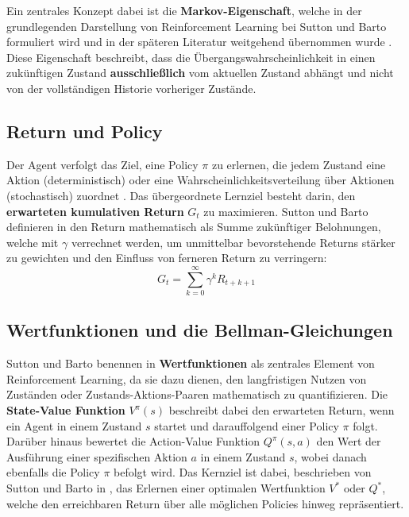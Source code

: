 Ein zentrales Konzept dabei ist die \textbf{Markov-Eigenschaft}, welche in der grundlegenden Darstellung von Reinforcement Learning bei Sutton und Barto formuliert wird und in der späteren Literatur weitgehend übernommen wurde \cite{sutton2018reinforcement, francois-lavetIntroductionDeepReinforcement2018, arulkumaranDRL2017}. Diese Eigenschaft beschreibt, dass die Übergangswahrscheinlichkeit in einen zukünftigen Zustand \textbf{ausschließlich} vom aktuellen Zustand abhängt und nicht von der vollständigen Historie vorheriger Zustände.
\subsection{Return und Policy} \label{ss:return_policy}
Der Agent verfolgt das Ziel, eine Policy $\pi$ zu erlernen, die jedem Zustand eine Aktion (deterministisch) oder eine Wahrscheinlichkeitsverteilung über Aktionen (stochastisch) zuordnet \cite{sutton2018reinforcement, francois-lavetIntroductionDeepReinforcement2018}. Das übergeordnete Lernziel besteht darin, den \textbf{erwarteten kumulativen Return} $G_t$ zu maximieren. Sutton und Barto definieren in \cite{sutton2018reinforcement} den Return mathematisch als Summe zukünftiger Belohnungen, welche mit $\gamma$ verrechnet werden, um unmittelbar bevorstehende Returns stärker zu gewichten und den Einfluss von ferneren Return zu verringern:
\begin{equation}
	G_t = \sum_{k=0}^{\infty}\gamma^k R_{t+k+1}
\end{equation}
\subsection{Wertfunktionen und die Bellman-Gleichungen}
Sutton und Barto benennen in \cite{sutton2018reinforcement} \textbf{Wertfunktionen} als zentrales Element von Reinforcement Learning, da sie dazu dienen, den langfristigen Nutzen von Zuständen oder Zustands-Aktions-Paaren mathematisch zu quantifizieren. Die \textbf{State-Value Funktion} $V^{\pi}(s)$ beschreibt dabei den erwarteten Return, wenn ein Agent in einem Zustand $s$ startet und darauffolgend einer Policy $\pi$ folgt. Darüber hinaus bewertet die Action-Value Funktion $Q^{\pi}(s, a)$ den Wert der Ausführung einer spezifischen Aktion $a$ in einem Zustand $s$, wobei danach ebenfalls die Policy $\pi$ befolgt wird. \newline
Das Kernziel ist dabei, beschrieben von Sutton und Barto in \cite{sutton2018reinforcement}, das Erlernen einer optimalen Wertfunktion $V^*$ oder $Q^*$, welche den erreichbaren Return über alle möglichen Policies hinweg repräsentiert.

